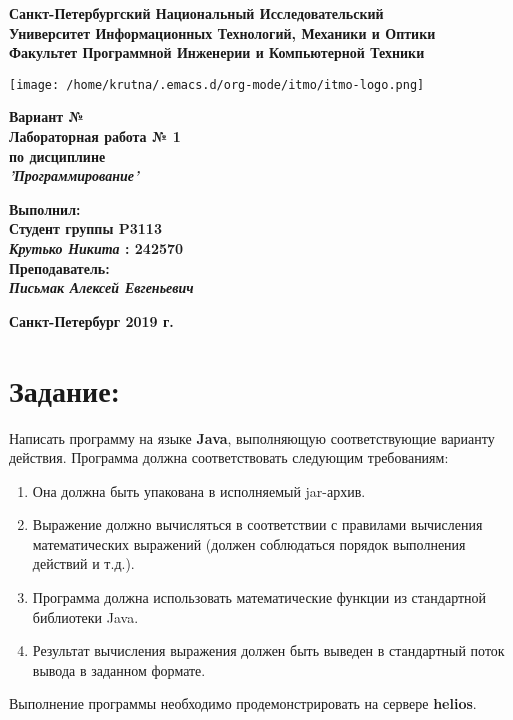 \documentclass[11pt]{article}
\author{Крутько Никита}
\date{\today}
\title{}
\begin{document}
\large
\thispagestyle{empty}
\begin{center}
\textbf{Санкт-Петербургский Национальный Исследовательский}\\
\textbf{Университет Информационных Технологий, Механики и Оптики}\\
\textbf{Факультет Программной Инженерии и Компьютерной Техники}\\
\end{center}
\vspace{1em}
\begin{center}
\texttt{[image: /home/krutna/.emacs.d/org-mode/itmo/itmo-logo.png]}
\end{center}
\LARGE
\vspace{5em}
\begin{center}
\textbf{Вариант №}\\
\textbf{Лабораторная работа № 1}\\
\Large
\textbf{по дисциплине}\\
\LARGE
\textbf{\emph{'Программирование'}}\\
\end{center}
\vspace{11em}
\large
\begin{flushright}
\textbf{Выполнил:}\\
\textbf{Студент группы P3113}\\
\textbf{\emph{Крутько Никита} : 242570}\\
\textbf{Преподаватель:}\\
\textbf{\emph{Письмак Алексей Евгеньевич}}\\
\end{flushright}
\vspace{4em}
\large
\begin{center}
\textbf{Санкт-Петербург 2019 г.}
\end{center}
\pagebreak{}
\setcounter{tocdepth}{2}
\tableofcontents
\vspace{2em}
\section{Задание:}
\label{sec:org7429683}
Написать программу на языке \textbf{Java}, выполняющую соответствующие варианту действия. Программа должна соответствовать следующим требованиям:
\begin{enumerate}
\item Она должна быть упакована в исполняемый jar-архив.
\item Выражение должно вычисляться в соответствии с правилами вычисления матема\-тических выражений (должен соблюдаться порядок выполнения действий и т.д.).
\item Программа должна использовать математические функции из стандартной биб\-лиотеки Java.
\item Результат вычисления выражения должен быть выведен в стандартный поток вывода в заданном формате.
\end{enumerate}
Выполнение программы необходимо продемонстрировать на сервере \textbf{helios}.
\end{document}
